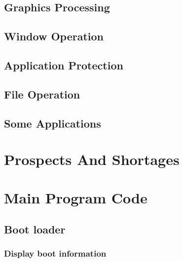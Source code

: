 \documentclass{swfcthesis}
\begin{document}
\section{Graphics Processing}

\section{Window Operation}

\section{Application Protection}

\section{File Operation}

\section{Some Applications}

\chapter{Prospects And Shortages}


\Appendix{}
\printbibliography[heading={bibintoc},title={参考文献}] %
\advisorinfopage{}                 %
\acknowledgmentspage{}             %


\chapter{Main Program Code} %

\section{Boot loader}

\subsection{Display boot information}
\label{sec:dis-boo-inf}

\inputminted[firstline=55, lastline=65,
  linenos=true]{nasm}{../../src/06day/RongC/ipl10.nas}
\end{document}
